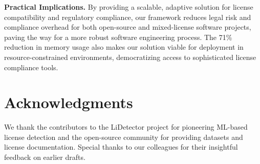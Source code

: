 \documentclass[12pt]{article}
\begin{document}
\textbf{Practical Implications.} By providing a scalable, adaptive solution for license compatibility and regulatory compliance, our framework reduces legal risk and compliance overhead for both open-source and mixed-license software projects, paving the way for a more robust software engineering process. The 71\% reduction in memory usage also makes our solution viable for deployment in resource-constrained environments, democratizing access to sophisticated license compliance tools.

\section*{Acknowledgments}
We thank the contributors to the LiDetector project for pioneering ML-based license detection and the open-source community for providing datasets and license documentation. Special thanks to our colleagues for their insightful feedback on earlier drafts.
\end{document}
